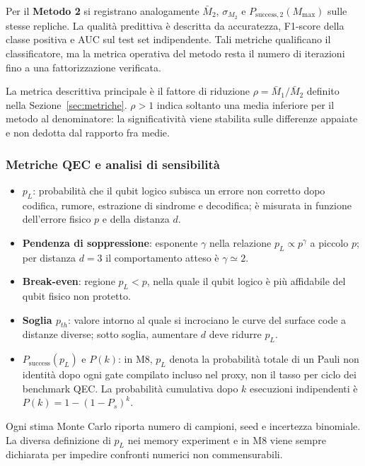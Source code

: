 \begin{onehalfspace}
Per il \textbf{Metodo 2} si registrano analogamente $\bar{M}_2$, $\sigma_{M_2}$ e $P_{\mathrm{success},2}(M_{\max})$ sulle stesse repliche. La qualità predittiva è descritta da accuratezza, F1-score della classe positiva e \ac{AUC} sul test set indipendente. Tali metriche qualificano il classificatore, ma la metrica operativa del metodo resta il numero di iterazioni fino a una fattorizzazione verificata.

La metrica descrittiva principale è il fattore di riduzione
$\rho=\bar{M}_1/\bar{M}_2$ definito nella Sezione~\ref{sec:metriche}.
$\rho>1$ indica soltanto una media inferiore per il metodo al denominatore: la
significatività viene stabilita sulle differenze appaiate e non dedotta dal
rapporto fra medie.

\subsubsection{Metriche QEC e analisi di sensibilità}

\begin{itemize}
    \item $p_L$: probabilità che il qubit logico subisca un errore non corretto dopo codifica, rumore, estrazione di sindrome e decodifica; è misurata in funzione dell'errore fisico $p$ e della distanza $d$.
    \item \textbf{Pendenza di soppressione}: esponente $\gamma$ nella relazione $p_L\propto p^\gamma$ a piccolo $p$; per distanza $d=3$ il comportamento atteso è $\gamma\simeq2$.
    \item \textbf{Break-even}: regione $p_L<p$, nella quale il qubit logico è più affidabile del qubit fisico non protetto.
    \item \textbf{Soglia $p_{th}$}: valore intorno al quale si incrociano le curve del surface code a distanze diverse; sotto soglia, aumentare $d$ deve ridurre $p_L$.
    \item $P_{\mathrm{success}}(p_L)$ e $P(k)$: in M8, $p_L$ denota la probabilità totale di un Pauli non identità dopo ogni gate compilato incluso nel proxy, non il tasso per ciclo dei benchmark QEC. La probabilità cumulativa dopo $k$ esecuzioni indipendenti è $P(k)=1-(1-P_s)^k$.
\end{itemize}

Ogni stima Monte Carlo riporta numero di campioni, seed e incertezza binomiale. La diversa definizione di $p_L$ nei memory experiment e in M8 viene sempre dichiarata per impedire confronti numerici non commensurabili.


\end{onehalfspace}
